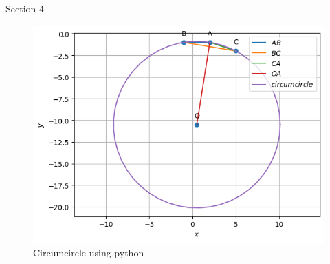 \begin{table}[H]
    \centering
    
    \caption{Section 4}
    \label{tab:Section4}
\end{table}
\begin{figure}[H]
\includegraphics[width=\columnwidth]{section4/figs/section4.png}
\caption{Circumcircle using python}
\label{fig:Circumcircle_plot}
\end{figure}
